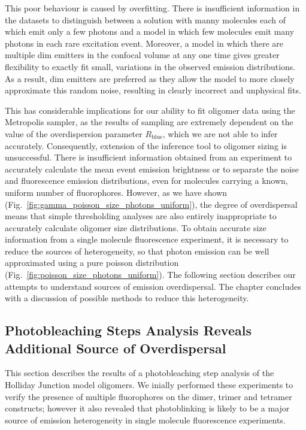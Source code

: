 This poor behaviour is caused by overfitting. There is insufficient information in the datasets to distinguish between a solution with manny molecules each of which emit only a few photons and a model in which few molecules emit many photons in each rare excitation event. Moreover, a model in which there are multiple dim emitters in the confocal volume at any one time gives greater flexibility to exactly fit small, variations in the observed emission distributions. As a result, dim emitters are preferred as they allow the model to more closely approximate this random noise, resulting in clearly incorrect  and unphysical fits.

This has considerable implications for our ability to fit oligomer data using the Metropolis sampler, as the results of sampling are extremely dependent on the value of the overdispersion parameter $R_{\text{blue}}$, which we are not able to infer accurately. Consequently, extension of the inference tool to oligomer sizing is unsuccessful. There is insufficient information obtained from an experiment to accurately calculate the mean event emission brightness or to separate the noise and fluorescence emission distributions, even for molecules carrying a known, uniform number of fluorophores. However, as we have shown (Fig.~\ref{fig:gamma_poisson_size_photons_uniform}), the degree of overdispersal means that simple thresholding analyses are also entirely inappropriate to accurately calculate oligomer size distributions. To obtain accurate size information from a single molecule fluorescence experiment, it is necessary to reduce the sources of heterogeneity, so that photon emission can be well approximated using a pure poisson distribution (Fig.~\ref{fig:poisson_size_photons_uniform}). The following section describes our attempts to understand sources of emission overdispersal. The chapter concludes with a discussion of possible methods to reduce this heterogeneity.   

\subsection{Photobleaching Steps Analysis Reveals Additional Source of Overdispersal}
This section describes the results of a photobleaching step analysis of the Holliday Junction model oligomers. We inially performed these experiments to verify the presence of multiple fluorophores on the dimer, trimer and tetramer constructs; however it also revealed that photoblinking is likely to be a major source of emission heterogeneity in single molecule fluorescence experiments.


